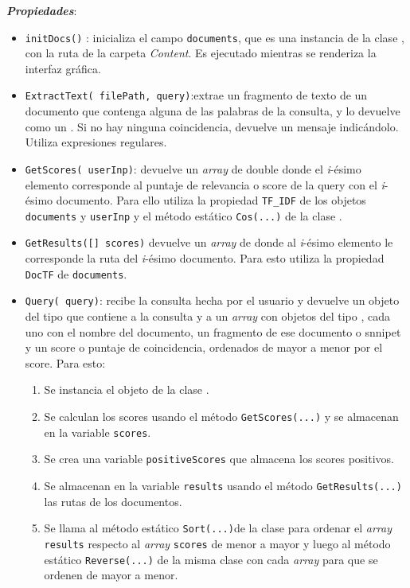 \documentclass{article}
\begin{document}
\begin{itemize}
\textit{\textbf{Propiedades}}:
\begin{itemize}
\item \texttt{initDocs()} : inicializa el campo \texttt{documents}, que es una instancia de la clase , con la ruta de la carpeta \textit{Content}. Es ejecutado mientras se renderiza la interfaz gráfica.
\item \texttt{ExtractText( filePath,  query)}:extrae un fragmento de texto de un documento que contenga alguna de las palabras de la consulta, y lo devuelve como un . Si no hay ninguna coincidencia, devuelve un mensaje indicándolo. Utiliza expresiones regulares.
\item \texttt{GetScores( userInp)}: devuelve un \textit{array} de \keyword
{double} donde el \textit{i}-ésimo elemento corresponde al puntaje de relevancia o score de la query con el \textit{i}-ésimo documento. Para ello utiliza la propiedad \texttt{TF\_IDF} de los objetos \texttt{documents} y \texttt{userInp} y el método estático \texttt{Cos(...)} de la clase .
\item \texttt{GetResults([] scores)} devuelve un \textit{array} de  donde al \textit{i}-ésimo elemento le corresponde la ruta del \textit{i}-ésimo documento. Para esto utiliza la propiedad \texttt{DocTF} de \texttt{documents}.
\item \texttt{Query( query)}: recibe la consulta hecha por el usuario y devuelve un objeto del tipo  que contiene a la consulta y a un \textit{array} con objetos del tipo , cada uno con el nombre del documento, un fragmento de ese documento o snnipet y un score o puntaje de coincidencia, ordenados de mayor a menor por el score.
Para esto:
\begin{enumerate}
\item Se instancia el objeto  de la clase .
\item Se calculan los scores usando el método \texttt{GetScores(...)} y se almacenan en la variable \texttt{scores}.
\item Se crea una variable \texttt{positiveScores} que almacena los scores positivos.
\item Se almacenan en la variable \texttt{results} usando el método \texttt{GetResults(...)} las rutas de los documentos.
\item Se llama al método estático \texttt{Sort(...)}de la clase  para ordenar el \textit{array} \texttt{results} respecto al \textit{array} \texttt{scores} de menor a mayor y luego al método estático \texttt{Reverse(...)} de la misma clase con cada \textit{array} para que se ordenen de mayor a menor.

\end{enumerate}
\end{itemize}
\end{itemize}
\end{document}
